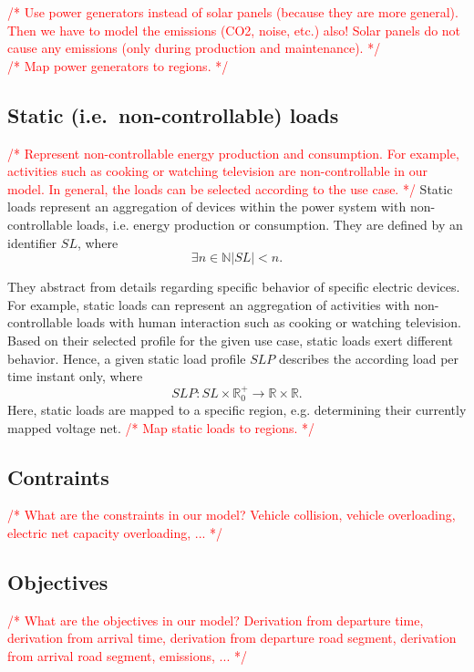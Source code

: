 \documentclass[conference]{IEEEtran}
\newcommand{\todo}[1]{\textcolor{red}{/* #1 */}}
\begin{document}
	\todo{Use power generators instead of solar panels (because they are more general). Then we have to model the emissions (CO2, noise, etc.) also! Solar panels do not cause any emissions (only during production and maintenance).}
	\\
	\todo{Map power generators to regions.}
	
	\subsection{Static (i.e.\ non-controllable) loads}
	\label{static_loads}
	\todo{Represent non-controllable energy production and consumption. For example, activities such as cooking or watching television are non-controllable in our model. In general, the loads can be selected according to the use case.}
	Static loads represent an aggregation of devices within the power system with non-controllable loads, i.e. energy production or consumption. 
	They are defined by an identifier $SL$, where 
	\[
	\exists n \in \mathbb{N} |SL| < n \mathrm{.}
	\]
		
	They abstract from details regarding specific behavior of specific electric devices.
	For example, static loads can represent an aggregation of activities with non-controllable loads with human interaction such as cooking or watching television. Based on their selected profile for the given use case, static loads exert different behavior.
	Hence, a given static load profile $SLP$ describes the according load per time instant only, where
	\[
	SLP : SL \times \mathbb{R}_0^+ \rightarrow \mathbb{R} \times \mathbb{R} \mathrm{.}
	\]
	Here, static loads are mapped to a specific region, e.g. determining their currently mapped voltage net.
	\todo{Map static loads to regions.}
	
	\subsection{Contraints}
	
	\todo{What are the constraints in our model? Vehicle collision, vehicle overloading, electric net capacity overloading, ...}
	
	\subsection{Objectives}
	
	\todo{What are the objectives in our model? Derivation from departure time, derivation from arrival time, derivation from departure road segment, derivation from arrival road segment, emissions, ...}
	
\end{document}
